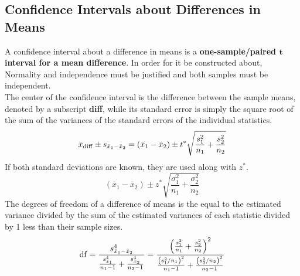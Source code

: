 \documentclass[../AP_Statistics.tex]{subfiles}
\begin{document}
			\subsection*{Confidence Intervals about Differences in Means}
				A confidence interval about a difference in means is a \textbf{one-sample/paired $\pmb{t}$ interval for a mean difference}. In order for it be constructed about, Normality and independence must be justified and both samples must be independent. \\
				The center of the confidence interval is the difference between the sample means, denoted by a subscript \textbf{diff}, while its standard error is simply the square root of the sum of the variances of the standard errors of the individual statistics.
				\[\bar{x}_{\mathrm{diff}} \pm s_{\bar{x}_1 - \bar{x}_2} = (\bar{x}_1 - \bar{x}_2) \pm t^*\sqrt{\frac{s_1^2}{n_1} + \frac{s_2^2}{n_2}}\]
				If both standard deviations are known, they are used along with $z^*$.
				\[(\bar{x}_1 - \bar{x}_2) \pm z^*\sqrt{\frac{\sigma_1^2}{n_1} +\frac{\sigma_2^2}{n_2}}\]
				The degrees of freedom of a difference of means is the equal to the estimated variance divided by the sum of the estimated variances of each statistic divided by 1 less than their sample sizes.
				\[\operatorname{\mathrm{df}} = \frac{s_{\bar{x}_1 - \bar{x}_2}^4}{\frac{s_{\bar{x}_1}^4}{n_1 - 1} + \frac{s_{\bar{x}_2}^4}{n_2 - 1}} = \frac{\left(\frac{s_1^2}{n_1} + \frac{s_2^2}{n_2}\right)^2}{\frac{\left(s_1^2/n_1\right)^2}{n_1 - 1} + \frac{\left(s_2^2/n_2\right)^2}{n_2 - 1}}\]
\end{document}
